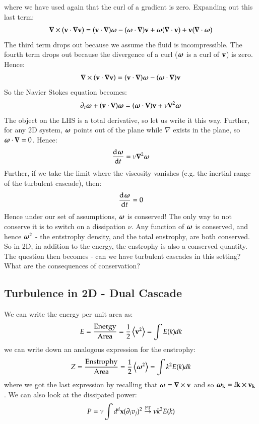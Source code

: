 where we have used again that the curl of a gradient is zero. Expanding out this last term:
\begin{equation}
    \nabla \times (\v{v} \cdot \nabla \v{v}) = (\v{v} \cdot \nabla)\gv{\omega} - (\gv{\omega}\cdot\nabla)\v{v} + \gv{\omega}(\nabla \cdot \v{v}) + \v{v}(\nabla \cdot \gv{\omega})
\end{equation}
The third term drops out because we assume the fluid is incompressible. The fourth term drops out because the divergence of a curl ($\mbox{\boldmath$ \omega $}$ is a curl of $\mathbf{v}$) is zero. Hence:
\begin{equation}
    \nabla \times (\v{v} \cdot \nabla \v{v}) = (\v{v} \cdot \nabla)\gv{\omega} - (\gv{\omega}\cdot\nabla)\v{v}
\end{equation}
So the Navier Stokes equation becomes:
\begin{equation}
    \p_t \gv{\omega} + (\v{v} \cdot \nabla)\gv{\omega} = (\gv{\omega} \cdot \nabla)\v{v} + \nu\nabla^2\gv{\omega}
\end{equation}
The object on the LHS is a total derivative, so let us write it this way. Further, for any 2D system, $\mbox{\boldmath$ \omega $}$ points out of the plane while $\nabla$ exists in the plane, so $\gv{\omega}\cdot\nabla = 0$. Hence:
\begin{equation}
    \dod{\gv{\omega}}{t} = \nu \nabla^2\gv{\omega}
\end{equation}
Further, if we take the limit where the viscosity vanishes (e.g. the inertial range of the turbulent cascade), then:
\begin{equation}
    \dod{\gv{\omega}}{t} = 0
\end{equation}
Hence under our set of assumptions, $\mbox{\boldmath$ \omega $}$ is conserved! The only way to not conserve it is to switch on a dissipation $\nu$. Any function of $\mbox{\boldmath$ \omega $}$ is conserved, and hence $\mbox{\boldmath$ \omega $}^2$ - the entstrophy density, and the total enstrophy, are both conserved. So in 2D, in addition to the energy, the enstrophy is also a conserved quantity. The question then becomes - can we have turbulent cascades in this setting? What are the consequences of conservation?

\subsection{Turbulence in 2D - Dual Cascade}
We can write the energy per unit area as:
\begin{equation}
    E = \frac{\text{Energy}}{\text{Area}} = \frac{1}{2}\left< \mathbf{v}^2 \right> = \int E(k)dk
\end{equation}
we can write down an analogous expression for the enstrophy:
\begin{equation}
    Z = \frac{\text{Enstrophy}}{\text{Area}} = \frac{1}{2}\left< \mbox{\boldmath$ \omega $}^2 \right> = \int k^2E(k)dk
\end{equation}
where we got the last expression by recalling that $\gv{\omega} = \nabla \times \v{v}$ and so $\mbox{\boldmath$ \omega $}_{\mathbf{\mathbf{k}}} = i\mathbf{k} \times \mathbf{v}_{\mathbf{k}}$. We can also look at the dissipated power:
\begin{equation}
    P = \nu \int d^d\mathbf{x}(\partial_i v_j)^2 \stackrel{\text{FT}}{\to} \nu k^2E(k)
\end{equation}

